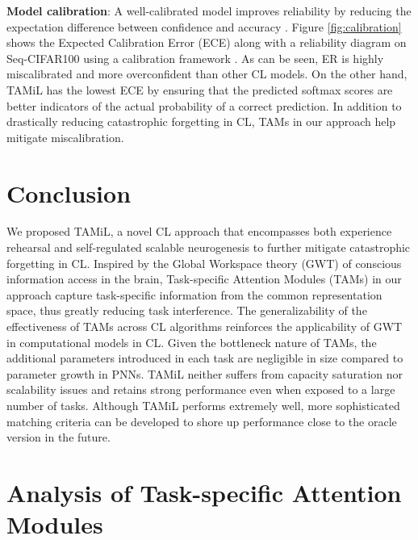 \documentclass{article} %
\begin{document}
\textbf{Model calibration}: 
A well-calibrated model improves reliability by reducing the expectation difference between confidence and accuracy \citep{guo2017calibration}. Figure \ref{fig:calibration} shows the Expected Calibration Error (ECE) along with a reliability diagram on Seq-CIFAR100 using a calibration framework \citep{kuppers2020multivariate}. As can be seen, ER is highly miscalibrated and more overconfident than other CL models. On the other hand, TAMiL has the lowest ECE by ensuring that the predicted softmax scores are better indicators of the actual probability of a correct prediction. In addition to drastically reducing catastrophic forgetting in CL, TAMs in our approach help mitigate miscalibration.


\section{Conclusion}
We proposed TAMiL, a novel CL approach that encompasses both experience rehearsal and self-regulated scalable neurogenesis to further mitigate catastrophic forgetting in CL. Inspired by the Global Workspace theory (GWT) of conscious information access in the brain, Task-specific Attention Modules (TAMs) in our approach capture task-specific information from the common representation space, thus greatly reducing task interference. The generalizability of the effectiveness of TAMs across CL algorithms reinforces the applicability of GWT in computational models in CL.  
Given the bottleneck nature of TAMs, the additional parameters introduced in each task are negligible in size compared to parameter growth in PNNs. TAMiL neither suffers from capacity saturation nor scalability issues and retains strong performance even when exposed to a large number of tasks. Although TAMiL performs extremely well, more sophisticated matching criteria can be developed to shore up performance close to the oracle version in the future. 





\newpage
\appendix

\section{Analysis of Task-specific Attention Modules}
\end{document}
